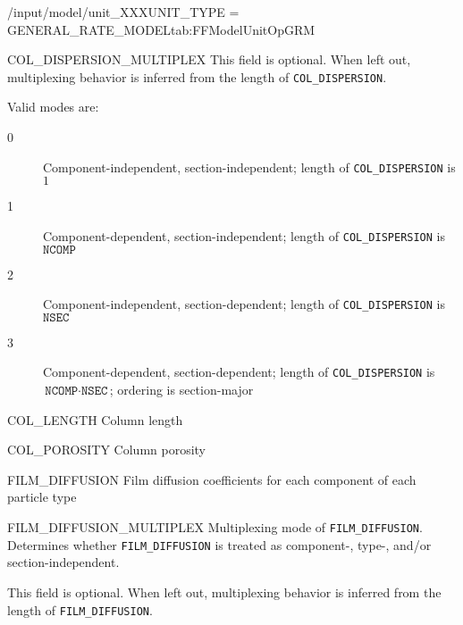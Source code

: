 \begin{condsubgroup}{/input/model/unit\_XXX}{UNIT\_TYPE = GENERAL\_RATE\_MODEL}{tab:FFModelUnitOpGRM}
\begin{dataset}[unit=--,type=int,range={$\{0, \dots, 3 \}$},length={1}]{COL\_DISPERSION\_MULTIPLEX}
    This field is optional.
    When left out, multiplexing behavior is inferred from the length of \texttt{COL\_DISPERSION}.

    Valid modes are:
    \begin{description}
      \item[0] Component-independent, section-independent; length of \texttt{COL\_DISPERSION} is $1$
      \item[1] Component-dependent, section-independent; length of \texttt{COL\_DISPERSION} is $\texttt{NCOMP}$
      \item[2] Component-independent, section-dependent; length of \texttt{COL\_DISPERSION} is $\texttt{NSEC}$
      \item[3] Component-dependent, section-dependent; length of \texttt{COL\_DISPERSION} is $\texttt{NCOMP} \cdot \texttt{NSEC}$; ordering is section-major
    \end{description}\vspace{-\baselineskip}
  \end{dataset}
  \begin{dataset}[unit=\si{\metre},type=double,range={$> 0$},length={1}]{COL\_LENGTH}
    Column length
  \end{dataset}
  \begin{dataset}[unit=--,type=double,range={$(0,1]$},length={1}]{COL\_POROSITY}
    Column porosity
  \end{dataset}
  \begin{dataset}[unit=\si{\metre\per\second},type=double,range={$\geq 0$},length={see \texttt{FILM\_DIFFUSION\_MULTIPLEX}}]{FILM\_DIFFUSION}
    Film diffusion coefficients for each component of each particle type
  \end{dataset}
  \begin{dataset}[unit=--,type=int,range={$\{0, \dots, 3 \}$},length={1}]{FILM\_DIFFUSION\_MULTIPLEX}
    Multiplexing mode of \texttt{FILM\_DIFFUSION}.
    Determines whether \texttt{FILM\_DIFFUSION} is treated as component-, type-, and/or section-independent.

    This field is optional.
    When left out, multiplexing behavior is inferred from the length of \texttt{FILM\_DIFFUSION}.


\end{dataset}
\end{condsubgroup}
